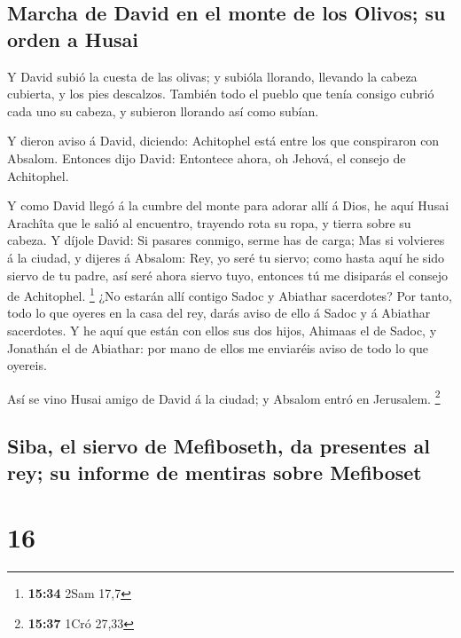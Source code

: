 \hypertarget{marcha-de-david-en-el-monte-de-los-olivos-su-orden-a-husai}{%
\subsection{Marcha de David en el monte de los Olivos; su orden a
Husai}\label{marcha-de-david-en-el-monte-de-los-olivos-su-orden-a-husai}}

 Y David subió la cuesta de las olivas; y subióla
llorando, llevando la cabeza cubierta, y los pies descalzos. También
todo el pueblo que tenía consigo cubrió cada uno su cabeza, y subieron
llorando así como subían.

 Y dieron aviso á David, diciendo: Achitophel está entre
los que conspiraron con Absalom. Entonces dijo David: Entontece ahora,
oh Jehová, el consejo de Achitophel.

 Y como David llegó á la cumbre del monte para adorar
allí á Dios, he aquí Husai Arachîta que le salió al encuentro, trayendo
rota su ropa, y tierra sobre su cabeza.  Y díjole David:
Si pasares conmigo, serme has de carga;  Mas si volvieres
á la ciudad, y dijeres á Absalom: Rey, yo seré tu siervo; como hasta
aquí he sido siervo de tu padre, así seré ahora siervo tuyo, entonces tú
me disiparás el consejo de Achitophel. \footnote{\textbf{15:34} 2Sam
  17,7}  ¿No estarán allí contigo Sadoc y Abiathar
sacerdotes? Por tanto, todo lo que oyeres en la casa del rey, darás
aviso de ello á Sadoc y á Abiathar sacerdotes.  Y he aquí
que están con ellos sus dos hijos, Ahimaas el de Sadoc, y Jonathán el de
Abiathar: por mano de ellos me enviaréis aviso de todo lo que oyereis.

 Así se vino Husai amigo de David á la ciudad; y Absalom
entró en Jerusalem. \footnote{\textbf{15:37} 1Cró 27,33}

\hypertarget{siba-el-siervo-de-mefiboseth-da-presentes-al-rey-su-informe-de-mentiras-sobre-mefiboset}{%
\subsection{Siba, el siervo de Mefiboseth, da presentes al rey; su
informe de mentiras sobre
Mefiboset}\label{siba-el-siervo-de-mefiboseth-da-presentes-al-rey-su-informe-de-mentiras-sobre-mefiboset}}

\hypertarget{section-15}{%
\section{16}\label{section-15}}

